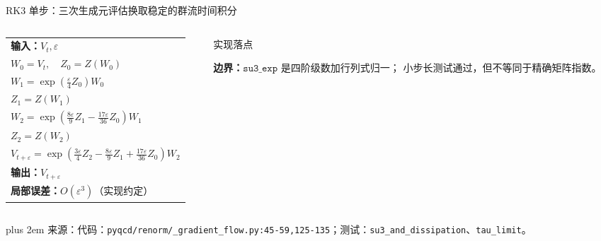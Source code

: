 \documentclass[UTF8,aspectratio=169,11pt]{ctexbeamer}
\newcommand{\source}[1]{%
  \par\vspace{0.02em}\begingroup\fontsize{6}{6.8}\selectfont\raggedright\sloppy
  \setlength{\emergencystretch}{3em}\rightskip=0pt plus 2em
  \color{muted}来源：#1\par\endgroup}
\begin{document}
\begin{frame}[t]{RK3 单步：三次生成元评估换取稳定的群流时间积分}
  \begin{columns}[T,totalwidth=\textwidth]
    \begin{column}{0.53\textwidth}
      \footnotesize
      \begin{tabular}{@{}l@{}}
        \textbf{输入：}\(V_t,\varepsilon\)\\
        \(W_0=V_t,\quad Z_0=Z(W_0)\)\\
        \(W_1=\exp\!\left(\frac{\varepsilon}{4}Z_0\right)W_0\)\\
        \(Z_1=Z(W_1)\)\\
        \(W_2=\exp\!\left(\frac{8\varepsilon}{9}Z_1
          -\frac{17\varepsilon}{36}Z_0\right)W_1\)\\
        \(Z_2=Z(W_2)\)\\
        \(V_{t+\varepsilon}=\exp\!\left(\frac{3\varepsilon}{4}Z_2
          -\frac{8\varepsilon}{9}Z_1+\frac{17\varepsilon}{36}Z_0\right)W_2\)\\
        \textbf{输出：}\(V_{t+\varepsilon}\)\\[0.3em]
        \textbf{局部误差：}\(O(\varepsilon^3)\)（实现约定）\\
      \end{tabular}
    \end{column}
    \begin{column}{0.43\textwidth}
      \begin{block}{实现落点}
        
      \end{block}
      \par\vspace{0.15em}
      \scriptsize\textbf{边界：}\(\texttt{su3\_exp}\) 是四阶级数加行列式归一；
      小步长测试通过，但不等同于精确矩阵指数。
    \end{column}
  \end{columns}
  \source{代码：\nolinkurl{pyqcd/renorm/_gradient_flow.py:45-59,125-135}；测试：\texttt{su3\_and\_dissipation}、\texttt{tau\_limit}。}
\end{frame}
\end{document}
